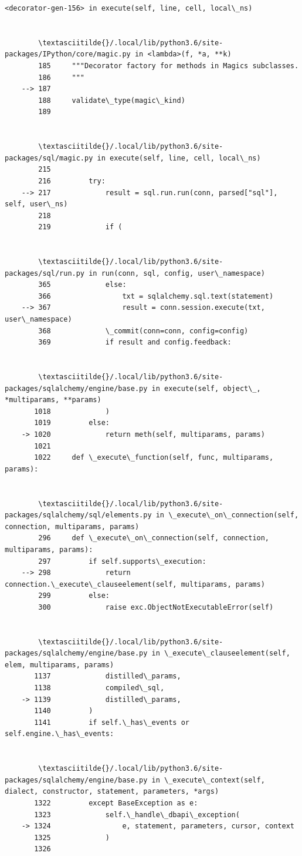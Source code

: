 \documentclass[11pt]{article}
\begin{document}
\begin{Verbatim}[commandchars=\\\{\}]
        <decorator-gen-156> in execute(self, line, cell, local\_ns)


        \textasciitilde{}/.local/lib/python3.6/site-packages/IPython/core/magic.py in <lambda>(f, *a, **k)
        185     """Decorator factory for methods in Magics subclasses.
        186     """
    --> 187 
        188     validate\_type(magic\_kind)
        189 


        \textasciitilde{}/.local/lib/python3.6/site-packages/sql/magic.py in execute(self, line, cell, local\_ns)
        215 
        216         try:
    --> 217             result = sql.run.run(conn, parsed["sql"], self, user\_ns)
        218 
        219             if (


        \textasciitilde{}/.local/lib/python3.6/site-packages/sql/run.py in run(conn, sql, config, user\_namespace)
        365             else:
        366                 txt = sqlalchemy.sql.text(statement)
    --> 367                 result = conn.session.execute(txt, user\_namespace)
        368             \_commit(conn=conn, config=config)
        369             if result and config.feedback:


        \textasciitilde{}/.local/lib/python3.6/site-packages/sqlalchemy/engine/base.py in execute(self, object\_, *multiparams, **params)
       1018             )
       1019         else:
    -> 1020             return meth(self, multiparams, params)
       1021 
       1022     def \_execute\_function(self, func, multiparams, params):


        \textasciitilde{}/.local/lib/python3.6/site-packages/sqlalchemy/sql/elements.py in \_execute\_on\_connection(self, connection, multiparams, params)
        296     def \_execute\_on\_connection(self, connection, multiparams, params):
        297         if self.supports\_execution:
    --> 298             return connection.\_execute\_clauseelement(self, multiparams, params)
        299         else:
        300             raise exc.ObjectNotExecutableError(self)


        \textasciitilde{}/.local/lib/python3.6/site-packages/sqlalchemy/engine/base.py in \_execute\_clauseelement(self, elem, multiparams, params)
       1137             distilled\_params,
       1138             compiled\_sql,
    -> 1139             distilled\_params,
       1140         )
       1141         if self.\_has\_events or self.engine.\_has\_events:


        \textasciitilde{}/.local/lib/python3.6/site-packages/sqlalchemy/engine/base.py in \_execute\_context(self, dialect, constructor, statement, parameters, *args)
       1322         except BaseException as e:
       1323             self.\_handle\_dbapi\_exception(
    -> 1324                 e, statement, parameters, cursor, context
       1325             )
       1326 



\end{Verbatim}
\end{document}

